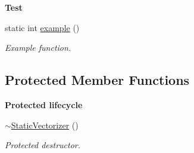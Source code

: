 \begin{Indent}{\bf Test}\par
\begin{DoxyCompactItemize}
\item 
static int \hyperlink{classmagrathea_1_1StaticVectorizer_af2e6bb70574c2b1bbec83b3769dcab8a}{example} ()
\begin{DoxyCompactList}\small\item\em Example function. \end{DoxyCompactList}\end{DoxyCompactItemize}
\end{Indent}
\subsection*{Protected Member Functions}
\begin{Indent}{\bf Protected lifecycle}\par
\begin{DoxyCompactItemize}
\item 
\hyperlink{classmagrathea_1_1StaticVectorizer_a5d421da12b047916b58fc13c6ebb7971}{$\sim$\-Static\-Vectorizer} ()
\begin{DoxyCompactList}\small\item\em Protected destructor. \end{DoxyCompactList}\end{DoxyCompactItemize}
\end{Indent}
